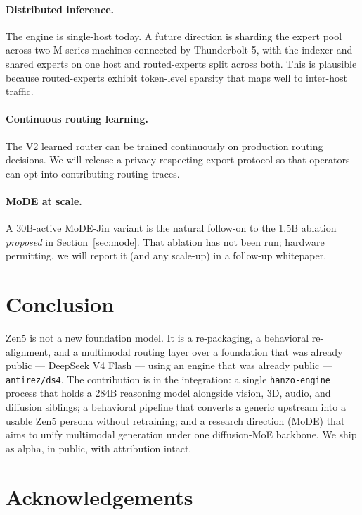\documentclass[11pt,a4paper]{article}
\begin{document}
\paragraph{Distributed inference.} The engine is single-host today. A future direction is sharding
the expert pool across two M-series machines connected by Thunderbolt 5, with the indexer and shared
experts on one host and routed-experts split across both. This is plausible because routed-experts
exhibit token-level sparsity that maps well to inter-host traffic.

\paragraph{Continuous routing learning.} The V2 learned router can be trained continuously on
production routing decisions. We will release a privacy-respecting export protocol so that operators
can opt into contributing routing traces.

\paragraph{MoDE at scale.} A 30B-active MoDE-Jin variant is the natural follow-on to the 1.5B
ablation \emph{proposed} in Section~\ref{sec:mode}. That ablation has not been run; hardware
permitting, we will report it (and any scale-up) in a follow-up whitepaper.

\section{Conclusion}

Zen5 is not a new foundation model. It is a re-packaging, a behavioral re-alignment, and a
multimodal routing layer over a foundation that was already public --- DeepSeek V4 Flash --- using an
engine that was already public --- \texttt{antirez/ds4}. The contribution is in the integration: a
single \texttt{hanzo-engine} process that holds a 284B reasoning model alongside vision, 3D, audio,
and diffusion siblings; a behavioral pipeline that converts a generic upstream into a usable Zen5
persona without retraining; and a research direction (MoDE) that aims to unify multimodal generation
under one diffusion-MoE backbone. We ship as alpha, in public, with attribution intact.

\section*{Acknowledgements}
\end{document}
